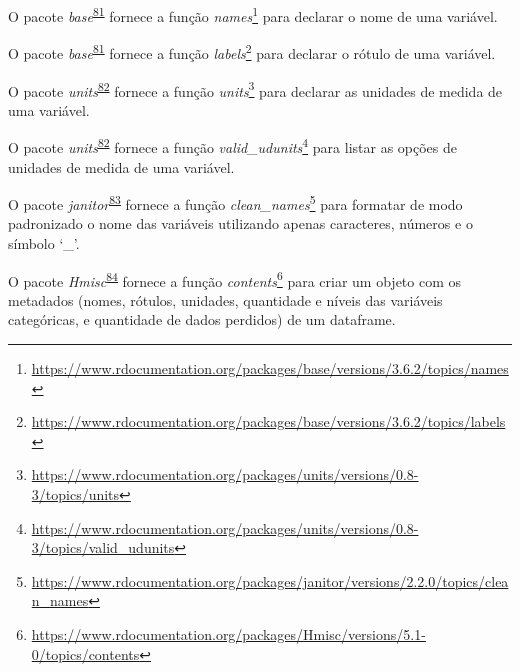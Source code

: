 \documentclass[
  a4paper,
]{book}
\renewcommand{\href}[2]{#2\footnote{\url{#1}}}
\newenvironment{infobox}[1]
  {
  \begin{itemize}
  \renewcommand{\labelitemi}{
    \raisebox{-.7\height}[0pt][0pt]{
      {\setkeys{Gin}{width=3em,keepaspectratio}
        \texttt{[image: \#1]}}
    }
  }
  \setlength{\fboxsep}{1em}
  \begin{blackbox}
  \item
  }
  {
  \end{blackbox}
  \end{itemize}
  }
\begin{document}
\begin{infobox}{images/Rlogo}
O pacote \emph{base}\textsuperscript{\protect\hyperlink{ref-base-3}{81}} fornece a função \href{https://www.rdocumentation.org/packages/base/versions/3.6.2/topics/names}{\emph{names}} para declarar o nome de uma variável.

\end{infobox}

\begin{infobox}{images/Rlogo}
O pacote \emph{base}\textsuperscript{\protect\hyperlink{ref-base-3}{81}} fornece a função \href{https://www.rdocumentation.org/packages/base/versions/3.6.2/topics/labels}{\emph{labels}} para declarar o rótulo de uma variável.

\end{infobox}

\begin{infobox}{images/Rlogo}
O pacote \emph{units}\textsuperscript{\protect\hyperlink{ref-units}{82}} fornece a função \href{https://www.rdocumentation.org/packages/units/versions/0.8-3/topics/units}{\emph{units}} para declarar as unidades de medida de uma variável.

\end{infobox}

\begin{infobox}{images/Rlogo}
O pacote \emph{units}\textsuperscript{\protect\hyperlink{ref-units}{82}} fornece a função \href{https://www.rdocumentation.org/packages/units/versions/0.8-3/topics/valid_udunits}{\emph{valid\_udunits}} para listar as opções de unidades de medida de uma variável.

\end{infobox}

\begin{infobox}{images/Rlogo}
O pacote \emph{janitor}\textsuperscript{\protect\hyperlink{ref-janitor}{83}} fornece a função \href{https://www.rdocumentation.org/packages/janitor/versions/2.2.0/topics/clean_names}{\emph{clean\_names}} para formatar de modo padronizado o nome das variáveis utilizando apenas caracteres, números e o símbolo `\_'.

\end{infobox}

\begin{infobox}{images/Rlogo}
O pacote \emph{Hmisc}\textsuperscript{\protect\hyperlink{ref-Hmisc}{84}} fornece a função \href{https://www.rdocumentation.org/packages/Hmisc/versions/5.1-0/topics/contents}{\emph{contents}} para criar um objeto com os metadados (nomes, rótulos, unidades, quantidade e níveis das variáveis categóricas, e quantidade de dados perdidos) de um dataframe.

\end{infobox}
\end{document}
